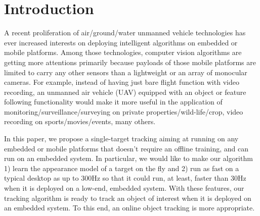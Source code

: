 \documentclass{bmvc2k}
\begin{document}
\section{Introduction}

A recent proliferation of air/ground/water unmanned vehicle
technologies has ever increased interests on deploying intelligent
algorithms on embedded or mobile platforms. Among those technologies,
computer vision algorithms are getting more attentions primarily
because payloads of those mobile platforms are limited to carry any
other sensors than a lightweight or an array of monocular cameras. For
example, instead of having just bare flight function with video
recording, an unmanned air vehicle (UAV) equipped with an object or
feature following functionality would make it more useful in the
application of monitoring/surveillance/surveying on private
properties/wild-life/crop, video recording on sports/movies/events,
many others.

In this paper, we propose a single-target tracking aiming at running
on any embedded or mobile platforms that doesn't require an offline
training, and can run on an embedded system. In particular, we would
like to make our algorithm 1) learn the appearance model of a target
on the fly and 2) run as fast on a typical desktop as up to 300Hz so
that it could run, at least, faster than 30Hz when it is deployed on a
low-end, embedded system. With these features, our tracking algorithm
is ready to track an object of interest when it is deployed on an
embedded system. To this end, an online object tracking is more
appropriate.
\end{document}
